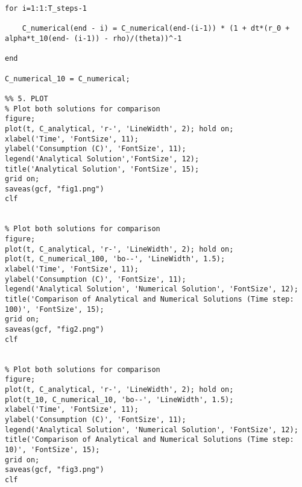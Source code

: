 \begin{lstlisting}
for i=1:1:T_steps-1
    
    C_numerical(end - i) = C_numerical(end-(i-1)) * (1 + dt*(r_0 + alpha*t_10(end- (i-1)) - rho)/(theta))^-1
    
end

C_numerical_10 = C_numerical;

%% 5. PLOT
% Plot both solutions for comparison
figure;
plot(t, C_analytical, 'r-', 'LineWidth', 2); hold on;
xlabel('Time', 'FontSize', 11);
ylabel('Consumption (C)', 'FontSize', 11);
legend('Analytical Solution','FontSize', 12);
title('Analytical Solution', 'FontSize', 15);
grid on;
saveas(gcf, "fig1.png")
clf


% Plot both solutions for comparison
figure;
plot(t, C_analytical, 'r-', 'LineWidth', 2); hold on;
plot(t, C_numerical_100, 'bo--', 'LineWidth', 1.5);
xlabel('Time', 'FontSize', 11);
ylabel('Consumption (C)', 'FontSize', 11);
legend('Analytical Solution', 'Numerical Solution', 'FontSize', 12);
title('Comparison of Analytical and Numerical Solutions (Time step: 100)', 'FontSize', 15);
grid on;
saveas(gcf, "fig2.png")
clf


% Plot both solutions for comparison
figure;
plot(t, C_analytical, 'r-', 'LineWidth', 2); hold on;
plot(t_10, C_numerical_10, 'bo--', 'LineWidth', 1.5);
xlabel('Time', 'FontSize', 11);
ylabel('Consumption (C)', 'FontSize', 11);
legend('Analytical Solution', 'Numerical Solution', 'FontSize', 12);
title('Comparison of Analytical and Numerical Solutions (Time step: 10)', 'FontSize', 15);
grid on;
saveas(gcf, "fig3.png")
clf


\end{lstlisting}


